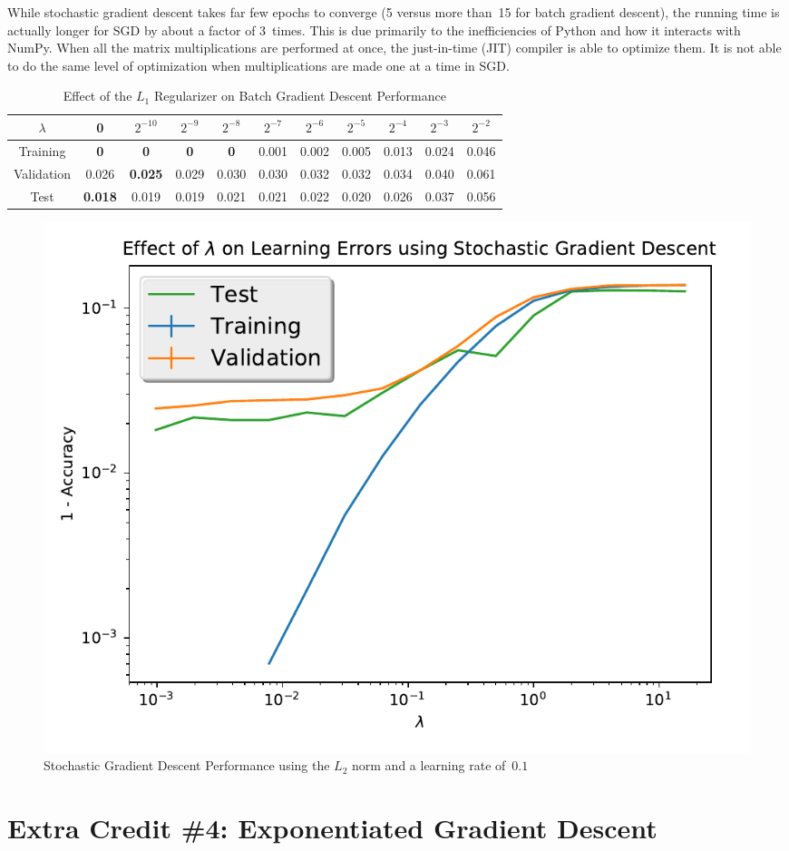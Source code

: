 \documentclass{report}
\begin{document}
  While stochastic gradient descent takes far few epochs to converge (5 versus more than~15 for batch gradient descent), the running time is actually longer for SGD by about a factor of 3~times.  This is due primarily to the inefficiencies of Python and how it interacts with NumPy.  When all the matrix multiplications are performed at once, the just-in-time (JIT) compiler is able to optimize them.  It is not able to do the same level of optimization when multiplications are made one at a time in SGD.
  
    \begin{table}[]
    \centering
    \caption{Effect of the $L_1$ Regularizer on Batch Gradient Descent Performance}
    \label{tab:stochasticGradientDescentL2}
    \begin{tabular}{c|c|c|c|c|c|c|c|c|c|c}
      \hline
      $\lambda$  & 0              & $2^{-10}$ & $2^{-9}$ & $2^{-8}$       & $2^{-7}$ & $2^{-6}$ & $2^{-5}$ & $2^{-4}$ & $2^{-3}$ & $2^{-2}$ \\ \hline
      Training   & \textbf{0}  & \textbf{0}    & \textbf{0}    & \textbf{0} & 0.001   & 0.002    & 0.005    & 0.013    & 0.024    & 0.046    \\ \hline
      Validation & 0.026 & \textbf{0.025}    & 0.029  & 0.030 & 0.030    & 0.032    & 0.032    & 0.034    & 0.040    & 0.061    \\ \hline
      Test       & \textbf{0.018} & 0.019     & 0.019    & 0.021          & 0.021    & 0.022    & 0.020    & 0.026    & 0.037    & 0.056    \\ \hline
    \end{tabular}
  \end{table}
  
  \begin{figure}
    \centering
    \includegraphics[scale=.5]{stochastic_GD_L2Norm}
    \caption{Stochastic Gradient Descent Performance using the $L_{2}$ norm and a learning rate of~$0.1$}\label{fig:stochasticGDL2}
  \end{figure}
    
  \section{Extra Credit \#4: Exponentiated Gradient Descent}
 
\end{document}
